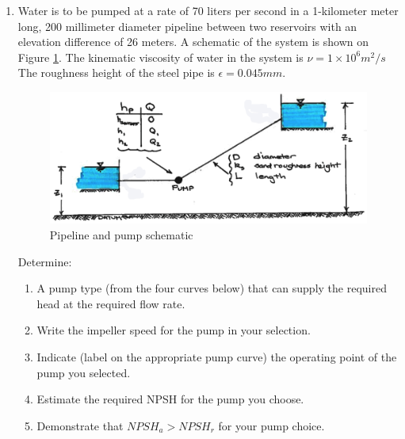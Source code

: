\documentclass[12pt]{article}
\begin{document}
\begin{enumerate}
\item Water is to be pumped at a rate of 70 liters per second in a 1-kilometer meter long, 200 millimeter diameter pipeline between two reservoirs with an elevation difference of 26 meters. A schematic of the system is shown on Figure \ref{fig:Q2ReservoirWithPump}. The kinematic viscosity of water in the system is $\nu = 1 \times 10^{6} m^2/s$ The
roughness height of the steel pipe is $\epsilon = 0.045 mm$.
\begin{figure}[h!] %
\centering
   \includegraphics[width=6in]{Q2ReservoirWithPump.png}
   \caption{Pipeline and pump schematic}
   \label{fig:Q2ReservoirWithPump} 
\end{figure}

Determine:
\begin{enumerate}
\item A pump type (from the four curves below) that can supply the required head at the required flow rate.
\item Write the impeller speed for the pump in your selection.
\item Indicate (label on the appropriate pump curve) the operating point of the pump you selected.
\item Estimate the required NPSH for the pump you choose.
\item Demonstrate that $NPSH_a > NPSH_r$ for your pump choice.
\end{enumerate}



\end{enumerate}
\end{document}

